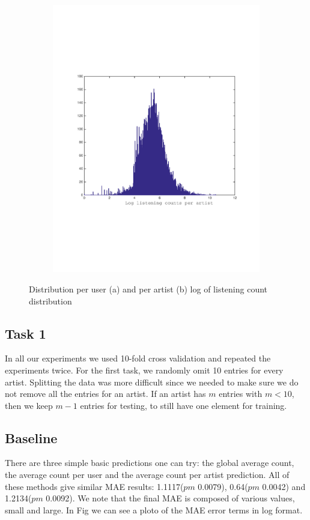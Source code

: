 \begin{figure}[h]
\begin{subfigure}[b]{0.45\textwidth}
    \includegraphics[width=\textwidth]{figures/histCountPerArtist.pdf}
    \caption{}
  \end{subfigure}
  \caption{Distribution per user (a) and per artist (b) log of listening count distribution}
  \label{fig:user_artist_distribution}
\end{figure}

 
\subsection{Task 1}
In all our experiments we used 10-fold cross validation and repeated the experiments twice.
For the first task, we randomly omit 10 entries for every artist.
Splitting the data was more difficult since we needed to make sure we do not
remove all the entries for an artist. If an artist has $m$ entries with $m < 10$, then we keep $m-1$ entries for testing,
 to still have one element for training.
 
 
\subsection{Baseline}
There are three simple basic predictions one can try: the global average count, the average count per user and the average count
per artist prediction. All of these methods give similar MAE results:  1.1117($pm$ 0.0079), 0.64($pm$ 0.0042) and   1.2134($pm$ 0.0092).
We note that the final MAE is composed of various values, small and large. In Fig we can see a ploto of the MAE error terms in log format.

